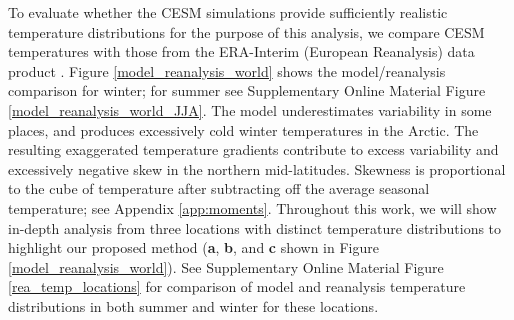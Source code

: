 \documentclass{ametsoc}
\begin{document}
To evaluate whether the CESM simulations provide sufficiently realistic temperature distributions for the purpose of this analysis, we compare CESM temperatures with those from the ERA-Interim (European Reanalysis) data product \citep{dee2011era}. Figure \ref{model_reanalysis_world} shows the model/reanalysis comparison for winter; for summer see Supplementary Online Material Figure \ref{model_reanalysis_world_JJA}. The model underestimates variability in some places, and produces excessively cold winter temperatures in the Arctic. The resulting exaggerated temperature gradients contribute to excess variability and excessively negative skew in the northern mid-latitudes.
Skewness is proportional to the cube of temperature after subtracting off the average seasonal temperature; see Appendix \ref{app:moments}. %
Throughout this work, we will show in-depth analysis from three locations with distinct temperature distributions to highlight our proposed method (\textbf{a}, \textbf{b}, and \textbf{c} shown in Figure \ref{model_reanalysis_world}). See Supplementary Online Material Figure \ref{rea_temp_locations} for comparison of model and reanalysis temperature distributions in both summer and winter for these locations. 
 
\end{document}
